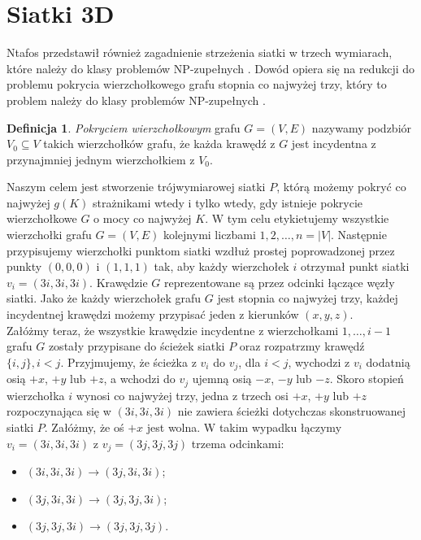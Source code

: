 \documentclass{xmgr}
\theoremstyle{definition}
\newtheorem{Definicja}{Definicja}
\begin{document}
 \section{Siatki 3D}
 	Ntafos przedstawił również zagadnienie strzeżenia siatki w trzech wymiarach, które należy do klasy problemów NP-zupełnych \cite{ntafos}. Dowód opiera się na redukcji do problemu pokrycia wierzchołkowego grafu stopnia co najwyżej trzy, który to problem należy do klasy problemów NP-zupełnych \cite{garey}.
\begin{Definicja}
	\emph{Pokryciem wierzchołkowym} grafu $G = (V,E)$ nazywamy podzbiór $V_0 \subseteq V$ takich wierzchołków grafu, że każda krawędź z $G$ jest incydentna z przynajmniej jednym wierzchołkiem z $V_0$.
\end{Definicja}
Naszym celem jest stworzenie trójwymiarowej siatki $P$, którą możemy pokryć co najwyżej $g(K)$ strażnikami wtedy i tylko wtedy, gdy istnieje pokrycie wierzchołkowe $G$ o mocy co najwyżej $K$.
W tym celu etykietujemy wszystkie wierzchołki grafu $G = (V,E)$ kolejnymi liczbami $1,2,\ldots,n = |V|$. Następnie przypisujemy wierzchołki punktom siatki wzdłuż prostej poprowadzonej przez punkty $(0,0,0)$ i $(1,1,1)$ tak, aby każdy wierzchołek $i$ otrzymał punkt siatki $v_i = (3i, 3i, 3i)$. Krawędzie $G$ reprezentowane są przez odcinki łączące węzły siatki. Jako że każdy wierzchołek grafu $G$ jest stopnia co najwyżej trzy, każdej incydentnej krawędzi możemy przypisać jeden z kierunków $(x,y,z)$.
\\\indent Załóżmy teraz, że wszystkie krawędzie incydentne z wierzchołkami \linebreak $1,\ldots,i-1$ grafu $G$ zostały przypisane do ścieżek siatki $P$ oraz rozpatrzmy krawędź $\{i,j\}, i < j$. Przyjmujemy, że ścieżka z $v_i$ do $v_j$, dla $i < j$, wychodzi z $v_i$ dodatnią osią $+x$, $+y$ lub $+z$, a wchodzi do $v_j$ ujemną osią $-x$, $-y$ lub $-z$. Skoro stopień wierzchołka $i$ wynosi co najwyżej trzy, jedna z trzech osi $+x$, $+y$ lub $+z$ rozpoczynająca się w $(3i, 3i, 3i)$ nie zawiera ścieżki dotychczas skonstruowanej siatki $P$. Załóżmy, że oś $+x$ jest wolna. W takim wypadku łączymy $v_i = (3i, 3i, 3i)$ z $v_j = (3j, 3j, 3j)$ trzema odcinkami:
\begin{itemize}
	\item $(3i, 3i, 3i) \rightarrow (3j, 3i, 3i)$;
	\item $(3j, 3i, 3i) \rightarrow (3j, 3j, 3i)$;
	\item $(3j, 3j, 3i) \rightarrow (3j, 3j, 3j)$.
\end{itemize}
\end{document}
